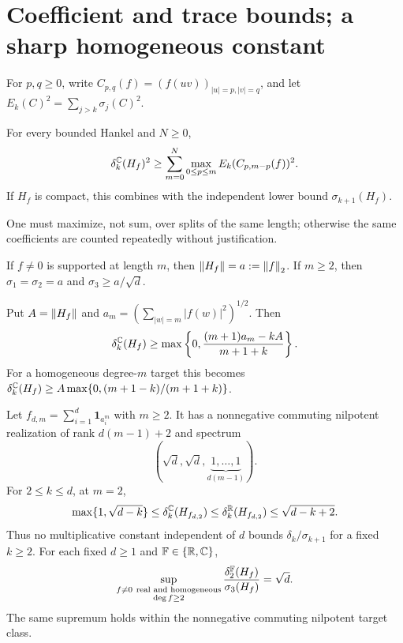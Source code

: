 \section{Coefficient and trace bounds; a sharp homogeneous constant}\label{I:S:sec:homogeneous}
For $p,q\ge0$, write $C_{p,q}(f)=(f(uv))_{|u|=p,|v|=q}$, and let $E_k(C)^2=\sum_{j>k}\sigma_j(C)^2$.

\begin{theorem}\label{I:S:thm:coefficient}
For every bounded Hankel and $N\ge0$,
\[
 \delta_k^\mathbb C(H_f)^2\ge
 \sum_{m=0}^N\max_{0\le p\le m}E_k(C_{p,m-p}(f))^2.
\]
If $H_f$ is compact, this combines with the independent lower bound $\sigma_{k+1}(H_f)$.
\end{theorem}

One must maximize, not sum, over splits of the same length; otherwise the same coefficients are counted repeatedly without justification.

\begin{lemma}\label{I:S:lem:homogeneous}
If $f\ne0$ is supported at length $m$, then $\left\lVert H_f\right\rVert=a:=\left\lVert f\right\rVert_2$. If $m\ge2$, then $\sigma_1=\sigma_2=a$ and $\sigma_3\ge a/\sqrt d$.
\end{lemma}


\begin{theorem}\label{I:S:thm:trace}
Put $A=\left\lVert H_f\right\rVert$ and $a_m=(\sum_{|w|=m}|f(w)|^2)^{1/2}$. Then
\[
 \delta_k^\mathbb C(H_f)\ge
 \max\left\{0,\frac{(m+1)a_m-kA}{m+1+k}\right\}.
\]
For a homogeneous degree-$m$ target this becomes
$\delta_k^\mathbb C(H_f)\ge A\max\{0,(m+1-k)/(m+1+k)\}$.
\end{theorem}


\begin{theorem}\label{I:S:thm:sharp}
Let $f_{d,m}=\sum_{i=1}^d\mathbf1_{a_i^m}$ with $m\ge2$. It has a nonnegative commuting nilpotent realization of rank $d(m-1)+2$ and spectrum
\[
 (\sqrt d,\sqrt d,\underbrace{1,\ldots,1}_{d(m-1)}).
\]
For $2\le k\le d$, at $m=2$,
\[
 \max\{1,\sqrt{d-k}\}\le\delta_k^\mathbb C(H_{f_{d,2}})
 \le\delta_k^\mathbb R(H_{f_{d,2}})\le\sqrt{d-k+2}.
\]
Thus no multiplicative constant independent of $d$ bounds $\delta_k/\sigma_{k+1}$ for a fixed $k\ge2$. For each fixed $d\ge1$ and $\mathbb F\in\{\mathbb R,\mathbb C\}$,
\begin{equation}\label{I:S:eq:sharp}
 \sup_{\substack{f\ne0\ \text{real and homogeneous}\\ \deg f\ge2}}
 \frac{\delta_{2}^{\mathbb F}(H_f)}{\sigma_3(H_f)}=\sqrt d.
\end{equation}
The same supremum holds within the nonnegative commuting nilpotent target class.
\end{theorem}


